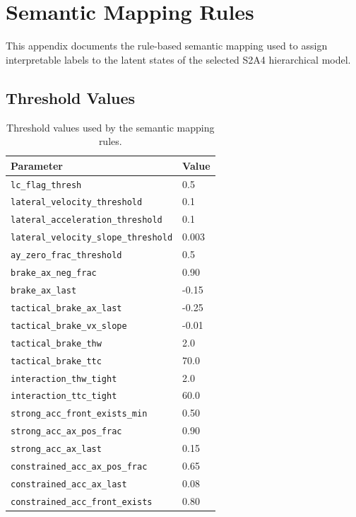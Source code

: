 \chapter{Semantic Mapping Rules}
\label{appendix:semantic_labeling_rules}

This appendix documents the rule-based semantic mapping used to assign interpretable labels to the latent states of the selected S2A4 hierarchical model.

\section{Threshold Values}

\begin{table}[htbp]
\centering
\small
\caption{Threshold values used by the semantic mapping rules.}
\label{tab:semantic_mapping_thresholds}
\begin{tabular}{l l}
\toprule
Parameter & Value \\
\midrule
\texttt{lc\_flag\_thresh} & 0.5 \\
\texttt{lateral\_velocity\_threshold} & 0.1 \\
\texttt{lateral\_acceleration\_threshold} & 0.1 \\
\texttt{lateral\_velocity\_slope\_threshold} & 0.003 \\
\texttt{ay\_zero\_frac\_threshold} & 0.5 \\
\texttt{brake\_ax\_neg\_frac} & 0.90 \\
\texttt{brake\_ax\_last} & -0.15 \\
\texttt{tactical\_brake\_ax\_last} & -0.25 \\
\texttt{tactical\_brake\_vx\_slope} & -0.01 \\
\texttt{tactical\_brake\_thw} & 2.0 \\
\texttt{tactical\_brake\_ttc} & 70.0 \\
\texttt{interaction\_thw\_tight} & 2.0 \\
\texttt{interaction\_ttc\_tight} & 60.0 \\
\texttt{strong\_acc\_front\_exists\_min} & 0.50 \\
\texttt{strong\_acc\_ax\_pos\_frac} & 0.90 \\
\texttt{strong\_acc\_ax\_last} & 0.15 \\
\texttt{constrained\_acc\_ax\_pos\_frac} & 0.65 \\
\texttt{constrained\_acc\_ax\_last} & 0.08 \\
\texttt{constrained\_acc\_front\_exists} & 0.80 \\

\end{tabular}
\end{table}
